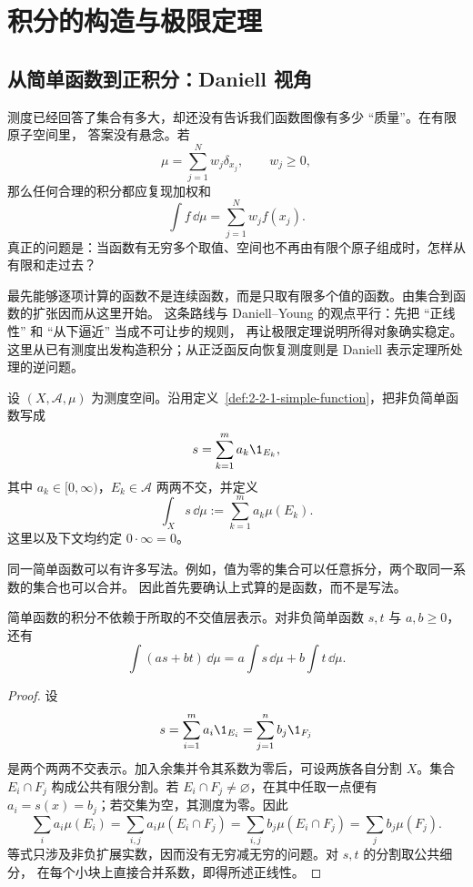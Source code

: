 \section{积分的构造与极限定理}\label{sec:03-01}

\subsection{从简单函数到正积分：Daniell 视角}\label{subsec:3-1-1}

测度已经回答了集合有多大，却还没有告诉我们函数图像有多少 ``质量''。在有限原子空间里，
答案没有悬念。若
\[
  \mu=\sum_{j=1}^N w_j\delta_{x_j},\qquad w_j\geq0,
\]
那么任何合理的积分都应复现加权和
\[
  \int f\,\dd\mu=\sum_{j=1}^Nw_jf(x_j).
  \tag{3.1.1}\label{eq:3-1-finite-observation}
\]
真正的问题是：当函数有无穷多个取值、空间也不再由有限个原子组成时，怎样从有限和走过去？

最先能够逐项计算的函数不是连续函数，而是只取有限多个值的函数。由集合到函数的扩张因而从这里开始。
这条路线与 Daniell--Young 的观点平行：先把 ``正线性'' 和 ``从下逼近'' 当成不可让步的规则，
再让极限定理说明所得对象确实稳定。这里从已有测度出发构造积分；从正泛函反向恢复测度则是
Daniell 表示定理所处理的逆问题。

\begin{definition}[非负简单函数的积分]\label{def:3-1-1-1}
设 $(X,\mathcal A,\mu)$ 为测度空间。沿用定义~\ref{def:2-2-1-simple-function}，把非负简单函数写成
\[
  s=\sum_{k=1}^m a_k\1_{E_k},
\]
其中 $a_k\in[0,\infty)$，$E_k\in\mathcal A$ 两两不交，并定义
\[
  \int_Xs\,\dd\mu:=\sum_{k=1}^ma_k\mu(E_k).
\]
这里以及下文均约定 $0\cdot\infty=0$。
\end{definition}

同一简单函数可以有许多写法。例如，值为零的集合可以任意拆分，两个取同一系数的集合也可以合并。
因此首先要确认上式算的是函数，而不是写法。

\begin{lemma}[简单函数积分表示无关]\label{lemma:3-1-1-1}
简单函数的积分不依赖于所取的不交值层表示。对非负简单函数 $s,t$ 与 $a,b\geq0$，还有
\[
  \int(as+bt)\,\dd\mu=a\int s\,\dd\mu+b\int t\,\dd\mu.
\]
\end{lemma}

\begin{proof}
设
\[
 s=\sum_{i=1}^m a_i\1_{E_i}=\sum_{j=1}^n b_j\1_{F_j}
\]
是两个两两不交表示。加入余集并令其系数为零后，可设两族各自分割 $X$。集合
$E_i\cap F_j$ 构成公共有限分割。若 $E_i\cap F_j\ne\varnothing$，在其中任取一点便有
$a_i=s(x)=b_j$；若交集为空，其测度为零。因此
\[
 \sum_i a_i\mu(E_i)
 =\sum_{i,j}a_i\mu(E_i\cap F_j)
 =\sum_{i,j}b_j\mu(E_i\cap F_j)
 =\sum_jb_j\mu(F_j).
\]
等式只涉及非负扩展实数，因而没有无穷减无穷的问题。对 $s,t$ 的分割取公共细分，
在每个小块上直接合并系数，即得所述正线性。
\end{proof}

